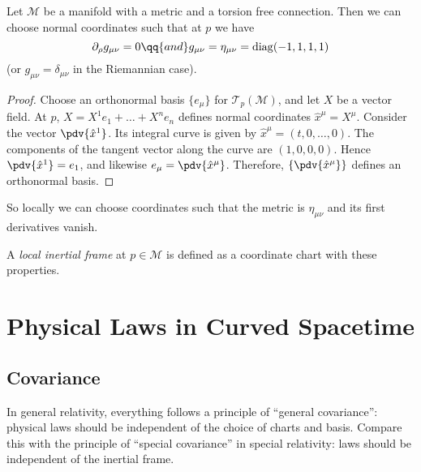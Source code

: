 \documentclass{jknotes}
\begin{document}
\begin{lemma}
    Let \(\mathcal{M}\) be a manifold with a metric and a torsion free connection. Then we can choose normal coordinates such that at \(p\) we have
    \begin{equation}
        \partial_\rho g_{\mu\nu} = 0 \qq{and} g_{\mu\nu} = \eta_{\mu\nu} = \operatorname{diag}(-1,1,1,1)
    \end{equation}
    (or \(g_{\mu\nu} = \delta_{\mu\nu}\) in the Riemannian case).
\end{lemma}
\begin{proof}
    Choose an orthonormal basis \(\{e_\mu\}\) for \(\mathcal{T}_p(\mathcal{M})\), and let \(X\) be a vector field. At \(p\), \(X=X^1e_1 + \dots + X^ne_n\) defines normal coordinates \(\hat{x}^\mu = X^\mu\). Consider the vector \(\pdv{\hat{x}^1}\). Its integral curve is given by \(\hat{x}^\mu = (t,0,\dots,0)\). The components of the tangent vector along the curve are \((1,0,0,0)\). Hence \(\pdv{\hat{x}^1} = e_1\), and likewise \(e_\mu = \pdv{\hat{x}^\mu}\). Therefore, \(\left\{\pdv{\hat{x}^\mu}\right\}\) defines an orthonormal basis.
\end{proof}
So locally we can choose coordinates such that the metric is \(\eta_{\mu\nu}\) and its first derivatives vanish.
\begin{defn}
    A \emph{local inertial frame} at \(p\in\mathcal{M}\) is defined as a coordinate chart with these properties.
\end{defn}

\section{Physical Laws in Curved Spacetime}

\subsection{Covariance}
In general relativity, everything follows a principle of ``general covariance'': physical laws should be independent of the choice of charts and basis. Compare this with the principle of ``special covariance'' in special relativity: laws should be independent of the inertial frame.
\end{document}
